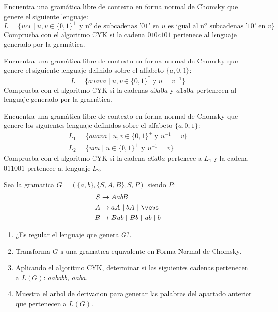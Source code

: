 \begin{ejercicio}\label{ej:1.6.11}
    Encuentra una gramática libre de contexto en forma normal de Chomsky que genere el siguiente lenguaje:
    \begin{equation*}
        L = \{ucv \mid u,v\in {\{0,1\}}^{+} \text{\ y nº de subcadenas '} 01 \text{' en\ } u \text{\ es igual al nº subcadenas '}10 \text{' en\ }v\}
    \end{equation*}
    Comprueba con el algoritmo CYK si la cadena $010c101$ pertenece al lenguaje generado por la gramática.
\end{ejercicio}

\begin{ejercicio}\label{ej:1.6.12}
    Encuentra una gramática libre de contexto en forma normal de Chomsky que genere el siguiente lenguaje definido sobre el alfabeto $\{a,0,1\}$:
    \begin{equation*}
        L = \{auava \mid u,v\in {\{0,1\}}^{\ast} \text{\ y\ } u=v^{-1}\}
    \end{equation*}
    Comprueba con el algoritmo CYK si la cadenas $a0a0a$ y $a1a0a$ pertenecen al lenguaje generado por la gramática.
\end{ejercicio}

\begin{ejercicio}\label{ej:1.6.13}
    Encuentra una gramática libre de contexto en forma normal de Chomsky que genere los siguientes lenguaje definidos sobre el alfabeto $\{a,0,1\}$:
    \begin{gather*}
        L_1 = \{auava \mid u,v \in {\{0,1\}}^{+} \text{\ y\ } u^{-1} = v\} \\
        L_2 = \{uvu \mid u\in {\{0,1\}}^{+}\text{\ y\ } u^{-1} = v\}
    \end{gather*}
    Comprueba con el algoritmo CYK si la cadena $a0a0a$ pertenece a $L_1$ y la cadena $011001$ pertenece al lenguaje $L_2$.
\end{ejercicio}

\begin{ejercicio}\label{ej:1.6.14}
    Sea la gramatica $G = (\{a,b\},\{S,A,B\},S,P)$ siendo $P$:
    \begin{align*}
        S&\rightarrow AabB \\
        A &\rightarrow aA\ |\ bA\ |\ \veps \\
        B&\rightarrow Bab\ |\ Bb\ |\ ab\ |\ b
    \end{align*}
    \begin{enumerate}[label=\alph*)]
        \item ¿Es regular el lenguaje que genera $G$?.
        \item Transforma $G$ a una gramatica equivalente en Forma Normal de Chomsky.
        \item Aplicando el algoritmo CYK, determinar si las siguientes cadenas pertenecen a $L(G)$: $aababb$, $aaba$.
        \item Muestra el arbol de derivacion para generar las palabras del apartado anterior que pertenecen a $L(G)$.
    \end{enumerate}
\end{ejercicio}

